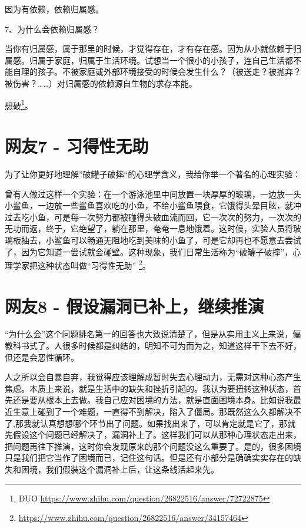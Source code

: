 因为有依赖，依赖归属感。

7、为什么会依赖归属感？

当你有归属感，属于那里的时候，才觉得存在，才有存在感。因为从小就依赖于归属感。归属于家庭，归属于生活环境。试想当一个很小的小孩子，连自己生活都不能自理的孩子。不被家庭或外部环境接受的时候会发生什么？（被送走？被抛弃？被伤害？……）对归属感的依赖源自生物的求存本能。

想破\footnote{DUO \url{https://www.zhihu.com/question/26822516/answer/72722875}}。

\section{网友7 - 习得性无助}

为了让你更好地理解”破罐子破摔“的心理学含义，我给你举一个著名的心理实验：

曾有人做过这样一个实验：在一个游泳池里中间放置一块厚厚的玻璃，一边放一头小鲨鱼，一边放一些鲨鱼喜欢吃的小鱼，不给小鲨鱼喂食，它饿得头晕目眩，就冲过去吃小鱼，可是每一次努力都被碰得头破血流而回，它一次次的努力，一次次的无功而返，终于，它绝望了，躺在那里，奄奄一息地饿着。这时候，实验人员将玻璃板抽去，小鲨鱼可以畅通无阻地吃到美味的小鱼了，可是它却再也不愿意去尝试了，因为它知道一尝试就会碰壁。这种现象，我们日常生活称为“破罐子破摔”，心理学家把这种状态叫做“习得性无助”
\footnote{\url{https://www.zhihu.com/question/26822516/answer/34157464}}。

\section{网友8 - 假设漏洞已补上，继续推演}

“为什么会”这个问题排名第一的回答也大致说清楚了，但是从实用主义上来说，偏教科书式了。人很多时候都是纠结的，明知不可为而为之，知道这样干下去不好，但还是会恶性循环。

人之所以会自暴自弃，我觉得应该理解成暂时失去心理动力，无需对这种心态产生焦虑。本质上来说，就是生活中的缺失和挫折引起的。我认为要扭转这种状态，首先还是要从根本上去做。我自己应对困境的方法，就是直面困境本身。比如说我最近生意上碰到了一个难题，一直得不到解决，陷入了僵局。那既然这么久都解决不了,那我就认真想想哪个环节出了问题。如果找出来了，可以肯定就是它了，那就先假设这个问题已经解决了，漏洞补上了。这样我们可以从那种心理状态走出来，把问题再往下推演，这时你会发现原来的那个问题没这么重要了。是的，很多困境只是我们把它当作了困境而已，记住这句话。但是还有小部分是确确实实存在的缺失和困境，我们假装这个漏洞补上后，让这条线活起来先。

